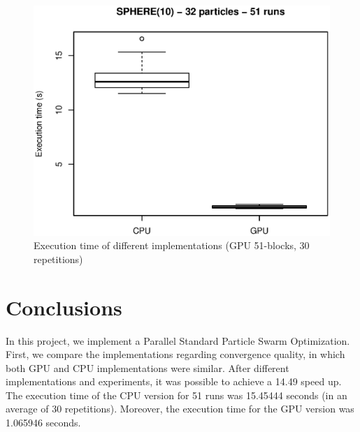 \documentclass{article}
\begin{document}
    \begin{figure}[!htb]
        \centering
        \includegraphics[width=.7\textwidth]{../img/sphere10_32particles_multi_runs_time.eps}
        \caption{Execution time of different implementations (GPU 51-blocks, 30 repetitions)}
        \label{fig:sphere10_32particles_multi_runs_time}
    \end{figure}

    \section{Conclusions}

    In this project, we implement a Parallel Standard Particle Swarm Optimization.
    First, we compare the implementations regarding convergence quality, in which both GPU and CPU implementations were similar.
    After different implementations and experiments, it was possible to achieve a 14.49 speed up. The execution time of the CPU version for 51 runs was 15.45444 seconds (in an average of 30 repetitions). Moreover, the execution time for the GPU version was 1.065946 seconds.

    
     
\end{document}
